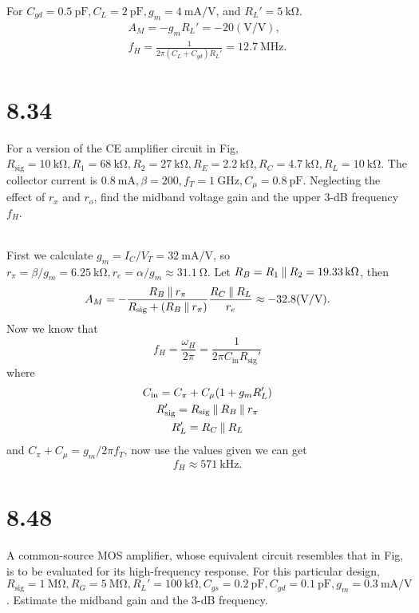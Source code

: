 \documentclass[12pt, a4paper]{article}
\begin{document}
For $C_{gd} = \SI{0.5}{\pF}, C_L = \SI{2}{\pF}, g_m = \SI{4}{\mA/\V}$, and
$R_L' = \SI{5}{\kohm}$.
\begin{gather*}
  A_{M} = -g_mR_L' = -20 (\si{\V/\V}), \\
  f_H = \frac{1}{2\pi (C_L+C_{gd})R_L'} = \SI{12.7}{\MHz}.
\end{gather*}

\section{8.34}
For a version of the CE amplifier circuit in Fig,
$R_{\text{sig}} = \SI{10}{\kohm}, R_1 = \SI{68}{\kohm}, R_2 = \SI{27}{\kohm},
R_E = \SI{2.2}{\kohm}, R_C = \SI{4.7}{\kohm}, R_L = \SI{10}{\kohm}.$
The collector current is $\SI{0.8}{\mA}, \beta = 200, f_T = \SI{1}{\GHz},
C_{\mu} = \SI{0.8}{\pF}$. Neglecting the effect of $r_x$ and $r_o$,
find the midband voltage gain and the upper 3-dB frequency $f_H$.

\Ans \\
First we calculate $g_m = I_C / V_T = \SI{32}{\mA/\V}$, so
$r_{\pi} = \beta/g_m = \SI{6.25}{\kohm},
r_e = \alpha/g_m \approx \SI{31.1}{\ohm}$.
Let $R_B = R_1 \paral R_2 = \SI{19.33}{\kohm}$, then
\[
  A_M = -\frac{R_B \paral r_{\pi}}{R_{\text{sig}}+(R_B\paral r_{\pi})}
  \frac{R_C \paral R_L}{r_e}
  \approx -32.8 (\si{\V/\V}).
\]
Now we know that
\[ f_H = \frac{\omega_H}{2\pi}
= \frac{1}{2\pi C_{\text{in}}R_{\text{sig}}'} \]
where
\begin{gather*}
  C_{\text{in}} = C_{\pi} + C_{\mu}(1+g_mR_L') \\
  R_{\text{sig}}' = R_{\text{sig}} \mathbin{\|} R_B \mathbin{\|} r_{\pi} \\
  R_{L}' = R_C \mathbin{\|} R_L
\end{gather*}
and $C_{\pi} + C_{\mu} = g_m/2\pi f_T$, now use the values given we can get
\[ f_H \approx \SI{571}{\kHz}. \]

\section{8.48}
A common-source MOS amplifier, whose equivalent circuit resembles that
in Fig, is to be evaluated for its high-frequency response. For this
particular design, $R_{\text{sig}} = \SI{1}{\Mohm}, R_G = \SI{5}{\Mohm},
R_L' = \SI{100}{\kohm}, C_{gs} = \SI{0.2}{\pF}, C_{gd} = \SI{0.1}{\pF},
g_m = \SI{0.3}{\mA/\V}$. Estimate the midband gain and the 3-dB frequency.
\end{document}

